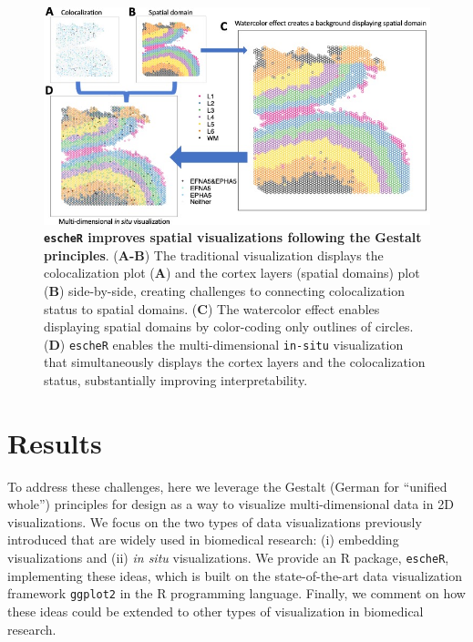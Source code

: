 \documentclass[10pt,twocolumn]{article}
\begin{document}
\begin{figure}[!t]
\begin{center}
\includegraphics[width=\textwidth]{Manuscript/figure/insitu.jpg}
\caption{\small \textbf{\texttt{escheR} improves spatial visualizations following the Gestalt principles}. (\textbf{A-B}) The traditional visualization displays the colocalization plot (\textbf{A}) and the cortex layers (spatial domains) plot (\textbf{B}) side-by-side, creating challenges to connecting colocalization status to spatial domains. (\textbf{C}) The watercolor effect enables displaying spatial domains by color-coding only outlines of circles. (\textbf{D}) \texttt{escheR} enables the multi-dimensional \texttt{in-situ} visualization that simultaneously displays the cortex layers and the colocalization status, substantially improving interpretability.}
\label{fig:visual} 
\end{center}
\end{figure}


\section{Results}

To address these challenges, here we leverage the Gestalt (German for “unified whole”) principles for design \cite{todorovic_2008, palmer_1999} as a way to visualize multi-dimensional data in 2D visualizations. We focus on the two types of data visualizations previously introduced that are widely used in biomedical research: (i) embedding visualizations and (ii) \textit{in situ} visualizations. We provide an R package, \texttt{escheR}, implementing these ideas, which is built on the state-of-the-art data visualization framework \texttt{ggplot2} in the R programming language. Finally, we comment on how these ideas could be extended to other types of visualization in biomedical research. 
\end{document}
